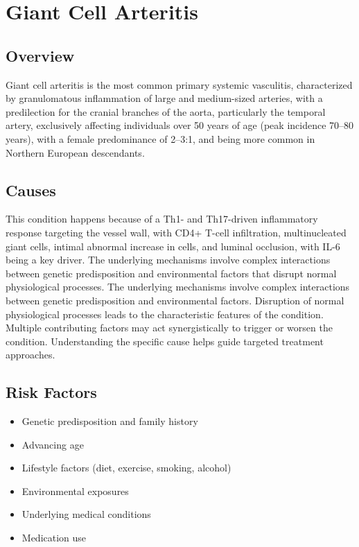 \chapter{Giant Cell Arteritis}
\label{sec:Giant Cell Arteritis}

\section{Overview}
Giant cell arteritis is the most common primary systemic vasculitis, characterized by granulomatous inflammation of large and medium-sized arteries, with a predilection for the cranial branches of the aorta, particularly the temporal artery, exclusively affecting individuals over 50 years of age (peak incidence 70--80 years), with a female predominance of 2--3:1, and being more common in Northern European descendants.
\section{Causes}
This condition happens because of a Th1- and Th17-driven inflammatory response targeting the vessel wall, with CD4+ T-cell infiltration, multinucleated giant cells, intimal abnormal increase in cells, and luminal occlusion, with IL-6 being a key driver. The underlying mechanisms involve complex interactions between genetic predisposition and environmental factors that disrupt normal physiological processes. The underlying mechanisms involve complex interactions between genetic predisposition and environmental factors. Disruption of normal physiological processes leads to the characteristic features of the condition. Multiple contributing factors may act synergistically to trigger or worsen the condition. Understanding the specific cause helps guide targeted treatment approaches.
\section{Risk Factors}


\begin{itemize}[noitemsep]
  \item Genetic predisposition and family history
  \item Advancing age
  \item Lifestyle factors (diet, exercise, smoking, alcohol)
  \item Environmental exposures
  \item Underlying medical conditions
  \item Medication use
\end{itemize}
